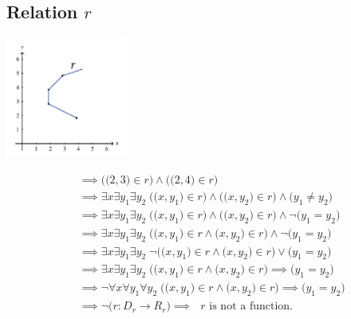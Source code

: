 \documentclass[12pt, letterpaper]{article}
\begin{document}
        \subsection{Relation \(r\) }
        \begin{center}
            \includegraphics[width=0.3\textwidth]{relation_r.png}
        \end{center}
        \begin{align*}
            & \implies \Big(\big(2, 3\big) \in r\Big) \wedge \Big(\big(2, 4\big) \in r\Big) \\ 
            & \implies \exists x \exists y_1 \exists y_2 \; \Big( \big(x, y_1\big) \in r \Big) \wedge
                                                   \Big( \big(x, y_2\big) \in r \Big) \wedge
                                                   \Big( y_1 \neq y_2 \Big) \\
            & \implies \exists x \exists y_1 \exists y_2 \; \Big( \big(x, y_1\big) \in r \Big) \wedge
                                                   \Big( \big(x, y_2\big) \in r \Big) \wedge
                                                   \neg\Big( y_1 = y_2 \Big) \\
            & \implies \exists x \exists y_1 \exists y_2 \; \Big( \big(x, y_1\big) \in r \wedge
                                                   \big(x, y_2\big) \in r \Big) \wedge
                                                   \neg\Big( y_1 = y_2 \Big) \\
            & \implies \exists x \exists y_1 \exists y_2 \; \neg\Big( \big(x, y_1\big) \in r \wedge
                                                   \big(x, y_2\big) \in r \Big) \lor
                                                   \Big( y_1 = y_2 \Big) \\
            & \implies \exists x \exists y_1 \exists y_2 \; \Big( \big(x, y_1\big) \in r \wedge
                                                   \big(x, y_2\big) \in r \Big) \implies
                                                   \Big( y_1 = y_2 \Big) \\
            & \implies \neg\forall x \forall y_1 \forall y_2 \; \Big( \big(x, y_1\big) \in r \wedge
                                                   \big(x, y_2\big) \in r \Big) \implies
                                                   \Big( y_1 = y_2 \Big) \\
            & \implies \neg\Big( r : D_{r} \to R_{r} \Big)
              \implies \text{ \(r\) is not a function.}
        \end{align*}
\end{document}
